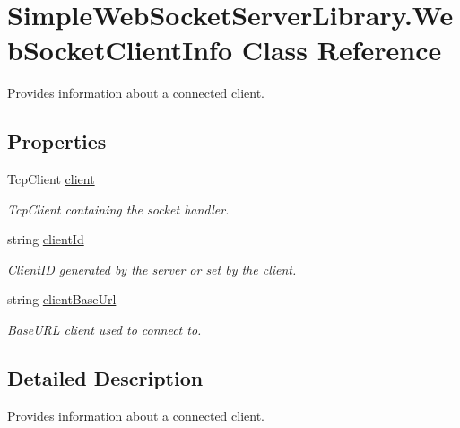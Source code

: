 \hypertarget{class_simple_web_socket_server_library_1_1_web_socket_client_info}{}\section{Simple\+Web\+Socket\+Server\+Library.\+Web\+Socket\+Client\+Info Class Reference}
\label{class_simple_web_socket_server_library_1_1_web_socket_client_info}


Provides information about a connected client.  


\subsection*{Properties}
\begin{DoxyCompactItemize}
\item 
Tcp\+Client \mbox{\hyperlink{class_simple_web_socket_server_library_1_1_web_socket_client_info_aba024d83617572017cc840759b251074}{client}}
\begin{DoxyCompactList}\small\item\em Tcp\+Client containing the socket handler. \end{DoxyCompactList}\item 
string \mbox{\hyperlink{class_simple_web_socket_server_library_1_1_web_socket_client_info_acebd7343b1d38251fba57353a82ecf42}{client\+Id}}
\begin{DoxyCompactList}\small\item\em Client\+ID generated by the server or set by the client. \end{DoxyCompactList}\item 
string \mbox{\hyperlink{class_simple_web_socket_server_library_1_1_web_socket_client_info_ad63571c277768d4ded702f39abbb0846}{client\+Base\+Url}}
\begin{DoxyCompactList}\small\item\em Base\+U\+RL client used to connect to. \end{DoxyCompactList}\end{DoxyCompactItemize}


\subsection{Detailed Description}
Provides information about a connected client. 



